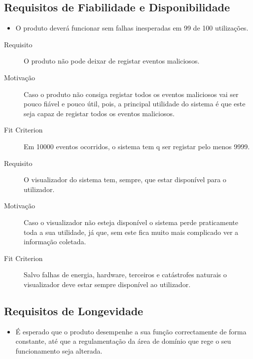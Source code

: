 


\subsection{Requisitos de Fiabilidade e Disponibilidade}
\begin{itemize}
\item O produto deverá funcionar sem falhas inesperadas em 99 de 100 utilizações.
\end{itemize}





\begin{description}
\item[Requisito] O produto não pode deixar de registar eventos maliciosos.
\item[Motivação] Caso o produto não consiga registar todos os eventos maliciosos vai ser pouco fiável e pouco útil, pois, a principal utilidade
do sistema é que este seja capaz de registar todos os eventos maliciosos.
\item[Fit Criterion] Em 10000 eventos ocorridos, o sistema tem q ser registar pelo menos 9999. 
\end{description}



\begin{description}
\item[Requisito] O visualizador do sistema tem, sempre, que estar disponível para o utilizador.
\item[Motivação] Caso o visualizador não esteja disponível o sistema perde praticamente toda a sua utilidade, já que, sem este fica muito mais 
complicado ver a informação coletada.
\item[Fit Criterion] Salvo falhas de energia, hardware, terceiros e catástrofes naturais o visualizador deve estar sempre disponível ao utilizador. 
\end{description}



\subsection{Requisitos de Longevidade}
\begin{itemize}
\item É esperado que o produto desempenhe a sua função correctamente de forma constante, até que a regulamentação da área de domínio que rege o seu funcionamento seja alterada.
\end{itemize}

